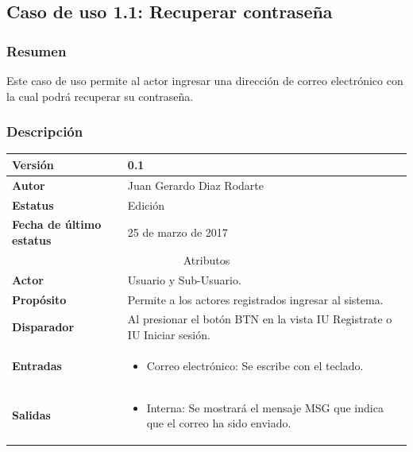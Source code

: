 \subsection{Caso de uso 1.1: Recuperar contraseña} \label{cu1_1}
\subsubsection{Resumen}
Este caso de uso permite al actor ingresar una dirección de correo electrónico con la cual podrá recuperar su contraseña.
\subsubsection{Descripción}
\begingroup
\setlength{\LTleft}{-10cm plus -1fill}
\setlength{\LTright}{\LTleft}
\begin{center}
    \addtocounter{table}{-1}
     \label{tab:cu1_1_tab}
	\begin{longtable}{| p{3.5cm} | p{11.5cm} |}
      	\hline
      		\textbf{Versión} &  0.1 \\
        \hline 
       		\textbf{Autor} & Juan Gerardo Diaz Rodarte\\
        \hline
          \textbf{Estatus} & Edición \\
        \hline  
          \textbf{Fecha de último estatus} & 25 de marzo de 2017 \\
        \hline
      \multicolumn{2}{|c|}{\large{Atributos}} \\
        \hline
          \textbf{Actor} & Usuario y Sub-Usuario. \\
        \hline	
          \textbf{Propósito} & Permite a los actores registrados ingresar al sistema. \\
        \hline
          \textbf{Disparador} & Al presionar el botón BTN en la vista IU Registrate o IU Iniciar sesión. \\
        \hline	
          \textbf{Entradas} & 
            \begin{itemize}
              \item Correo electrónico: Se escribe con el teclado.
            \end{itemize} \\
        \hline	
          \textbf{Salidas} & 
            \begin{itemize}
              \item Interna: Se mostrará el mensaje MSG que indica que el correo ha sido enviado.
            \end{itemize} \\

\end{longtable}
\end{center}
